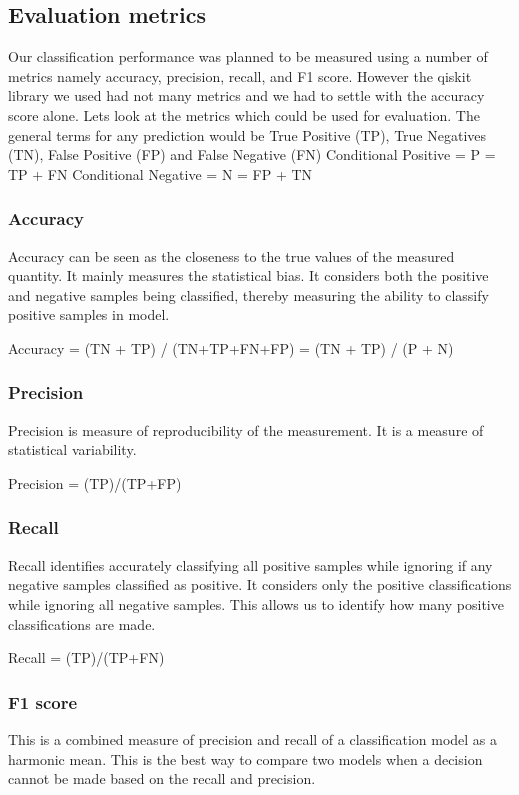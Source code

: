 \documentclass[10pt,journal,compsoc]{IEEEtran}
\begin{document}
\subsection{Evaluation metrics}
Our classification performance was planned to be measured using a number of metrics namely accuracy, precision, recall, and F1 score. However the qiskit library we used had not many metrics and we had to settle with the accuracy score alone. Lets look at the metrics which could be used for evaluation. The general terms for any prediction would be True Positive (TP), True Negatives (TN), False Positive (FP) and False Negative (FN)
Conditional Positive = P = TP + FN	
Conditional Negative = N = FP + TN

\subsubsection{Accuracy}
Accuracy can be seen as the closeness to the true values of the measured quantity. It mainly measures the statistical bias. It considers both the positive and negative samples being classified, thereby measuring the ability to classify positive samples in model.

Accuracy = (TN + TP) / (TN+TP+FN+FP) 
       = (TN + TP) / (P + N)		
       
\subsubsection{Precision}
Precision is measure of reproducibility of the measurement. It is a measure of statistical variability.

Precision = (TP)/(TP+FP)

\subsubsection{Recall}
Recall identifies accurately classifying all positive samples while ignoring if any negative samples classified as positive. It considers only the positive classifications while ignoring all negative samples. This allows us to identify how many positive classifications are made.

Recall = (TP)/(TP+FN)

\subsubsection{F1 score}
This is a combined measure of precision and recall of a classification model as a harmonic mean. This is the best way to compare two models when a decision cannot be made based on the recall and precision.
\end{document}
